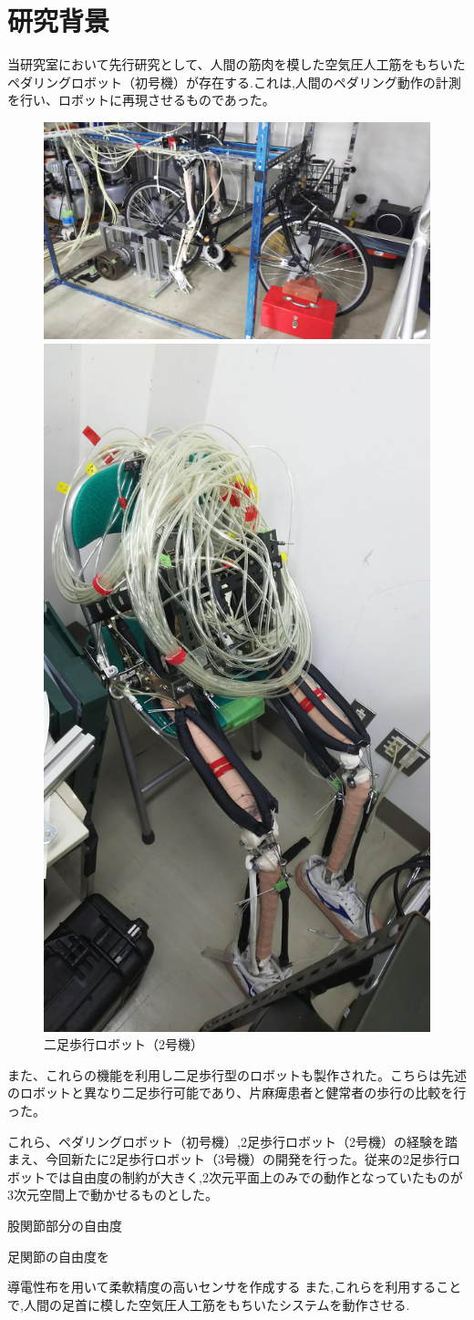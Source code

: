 \section{研究背景}
当研究室において先行研究として、人間の筋肉を模した空気圧人工筋をもちいたペダリングロボット（初号機）が存在する.これは,人間のペダリング動作の計測を行い、ロボットに再現させるものであった。
\begin{figure}[!t]
 \begin{center}
  \includegraphics[width=0.5\columnwidth,clip]{Photo/BackGround/1st.eps}
  \caption{ペダリングロボット（初号機）}
  \label{初号機}
  \includegraphics[width=0.25\columnwidth,clip]{Photo/BackGround/2nd.eps}
  \caption{二足歩行ロボット（2号機）}
  \label{2号機}
 \end{center}
\end{figure}

また、これらの機能を利用し二足歩行型のロボットも製作された。こちらは先述のロボットと異なり二足歩行可能であり、片麻痺患者と健常者の歩行の比較を行った。

これら、ペダリングロボット（初号機）,2足歩行ロボット（2号機）の経験を踏まえ、今回新たに2足歩行ロボット（3号機）の開発を行った。従来の2足歩行ロボットでは自由度の制約が大きく,2次元平面上のみでの動作となっていたものが3次元空間上で動かせるものとした。

股関節部分の自由度

足関節の自由度を

導電性布を用いて柔軟精度の高いセンサを作成する
また,これらを利用することで,人間の足首に模した空気圧人工筋をもちいたシステムを動作させる.

